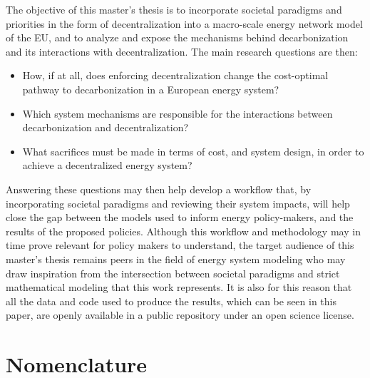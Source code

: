 \documentclass[preprint,12pt,nopreprintline]{elsarticle}
\begin{document}
\medskip
\noindent The objective of this master's thesis is to incorporate societal paradigms and priorities in the form of decentralization into a macro-scale energy network model of the EU, and to analyze and expose the mechanisms behind decarbonization and its interactions with decentralization. The main research questions are then:
\begin{itemize}
\item How, if at all, does enforcing decentralization change the cost-optimal pathway to decarbonization in a European energy system?
\item Which system mechanisms are responsible for the interactions between decarbonization and decentralization?
\item What sacrifices must be made in terms of cost, and system design, in order to achieve a decentralized energy system?
\end{itemize}
Answering these questions may then help develop a workflow that, by incorporating societal paradigms and reviewing their system impacts, will help close the gap between the models used to inform energy policy-makers, and the results of the proposed policies. Although this workflow and methodology may in time prove relevant for policy makers to understand, the target audience of this master's thesis remains peers in the field of energy system modeling who may draw inspiration from the intersection between societal paradigms and strict mathematical modeling that this work represents. It is also for this reason that all the data and code used to produce the results, which can be seen in this paper, are openly available in a public repository under an open science license\cite{GNUGeneralPublic}.

\section{Nomenclature}
\end{document}
